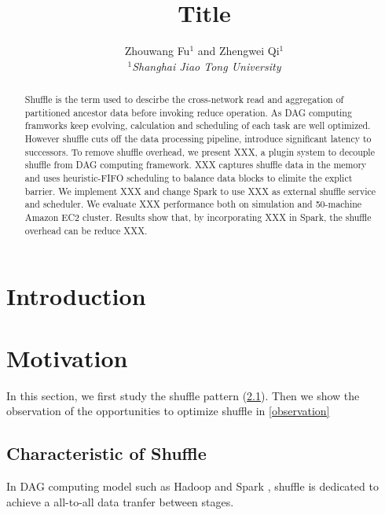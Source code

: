 \documentclass[10pt,twocolumn]{article}
\begin{document}
\title{Title}
\author{Zhouwang Fu$^1$ and Zhengwei Qi$^1$ \\
\small {\em  $^1$Shanghai Jiao Tong University} \\ [2mm]
}
\date{}
\maketitle

\begin{abstract}
Shuffle is the term used to descirbe the cross-network read and aggregation
of partitioned ancestor data before invoking reduce operation.
As DAG computing framworks keep evolving, calculation and scheduling of each task are well optimized. 
However shuffle cuts off the data processing pipeline, introduce significant latency to successors.
To remove shuffle overhead, we present XXX, a plugin system to decouple shuffle from DAG computing 
framework. XXX captures shuffle data in the memory and uses heuristic-FIFO scheduling to balance data
blocks to elimite the explict barrier. We implement XXX and change Spark to use XXX as external shuffle 
 service and scheduler. We evaluate XXX performance both on simulation and 50-machine Amazon EC2 cluster.
 Results show that, by incorporating XXX in Spark, the shuffle overhead can be reduce XXX.

\end{abstract}

\section{Introduction}

\section{Motivation}
In this section, we first study the shuffle pattern (\ref{shuffle pattern}). 
Then we show the observation of the opportunities to optimize shuffle in \ref{observation}
\subsection{Characteristic of Shuffle} \label{shuffle pattern}
In DAG computing model such as Hadoop \cite{hadoop} and Spark \cite{spark}, shuffle is dedicated to achieve a
all-to-all data tranfer between stages.
\end{document}
